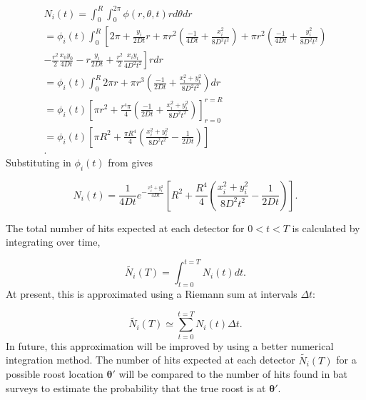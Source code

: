 \begin{multline}
N_i(t) = \int_0^R \int_0^{2\pi} \phi(r,\theta,t) r d\theta dr \\
= \phi_i(t) \int_0^R \left[ 2\pi + \frac{y_i}{2Dt}r + \pi r^2 \left(\frac{-1}{4Dt} + \frac{x_i^2}{8D^2t^2}  \right) + \pi r^2 \left( \frac{-1}{4Dt} + \frac{y_i^2}{8D^2t^2} \right) \right. \\
\left. - \frac{r^2}{2} \frac{x_0y_0}{4Dt}  - r \frac{y_i}{2Dt}  + \frac{r^2}{2} \frac{x_iy_i}{4D^2t^2} \right] r dr \\
= \phi_i(t) \int_0^R 2\pi r + \pi r^3 \left( \frac{-1}{2Dt} + \frac{x_i^2+y_i^2}{8D^2t^2} \right)  dr \\
= \phi_i(t) \left[ \pi r^2 + \frac{r^4\pi}{4}\left( \frac{-1}{2Dt} + \frac{x_i^2 + y_i^2}{8D^2t^2} \right) \right]_{r=0}^{r=R} \\
= \phi_i(t) \left[ \pi R^2 + \frac{\pi R^4}{4} \left( \frac{x_i^2 + y_i^2}{8D^2t^2} - \frac{1}{2Dt} \right) \right] \\ .
\nonumber
\end{multline}
%
Substituting in $\phi_i(t)$ from  gives

\begin{equation}
  N_i(t) = \frac{1}{4Dt} e^{-\frac{x_i^2 + y_i^2}{4Dt}} \left[ R^2 + \frac{R^4}{4} \left( \frac{x_i^2 + y_i^2}{8D^2t^2} - \frac{1}{2Dt} \right)\right] .
\end{equation}

The total number of hits expected at each
detector for $0 < t < T$ is calculated by integrating over time,

\begin{equation}
  \tilde{N_i}(T) = \int_{t=0}^{t=T} N_i(t) dt.
\end{equation}
%
At present, this is approximated using a Riemann sum at intervals $\Delta t$:

\begin{equation}
  \tilde{N_i}(T) \simeq \sum_{t=0}^{t=T} N_i(t) \Delta t.
  \label{eqn:expect_hits}
\end{equation}
%
In future, this approximation will be improved by using a better numerical
integration method. The number of hits expected at each detector $\tilde{N_i}(T)$ for a possible roost location $\bm{\theta'}$ will be compared to the number of hits found in bat surveys to estimate the probability that the true roost is at $\bm{\theta'}$.

